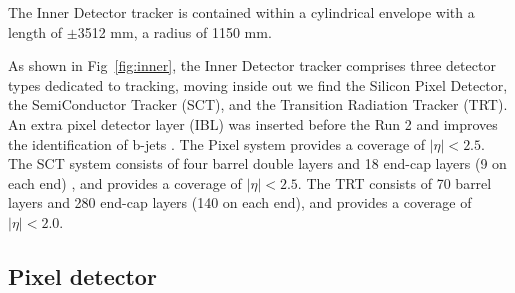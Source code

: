 The Inner Detector tracker is contained within a cylindrical envelope with a length of $\pm$3512 mm, a radius of 1150 mm.
\par As shown in Fig~\ref{fig:inner}, the Inner Detector tracker comprises three detector types dedicated to tracking, 
moving inside out we find the Silicon Pixel Detector, the SemiConductor Tracker (SCT), and the Transition Radiation Tracker (TRT). An extra pixel detector layer 
(IBL)\cite{Capeans:1291633} 
was inserted before the Run 2 and improves the identification of b-jets \cite{ATL-PHYS-PUB-2015-022}. The Pixel system provides a coverage of $|\eta|<2.5$.
The SCT system consists of four barrel double layers and 18 end-cap layers (9 on each end) \cite{Aad:2014mta}, and provides a coverage of $|\eta| < 2.5$.
The TRT consists of 70 barrel layers and 280 end-cap layers (140 on each end), and provides a coverage of $|\eta| < 2.0$\cite{Aad:2014mta}.


\subsection{Pixel detector}
\label{sec:pixel}


